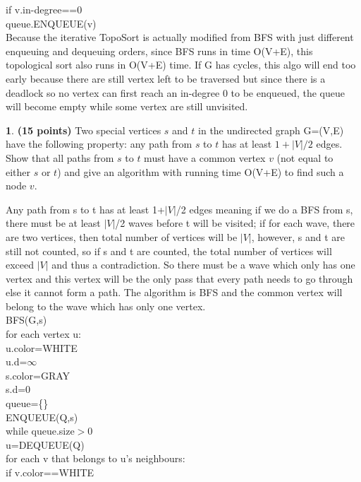\documentclass[11pt]{article}
\theoremstyle{definition}
\theoremstyle{theorem}
\newtheorem{prob}{}
\newcommand{\solution}{\medskip\noindent{\color{DarkBlue}\textbf{Solution:}}}
\begin{document}
\null\qquad\qquad\qquad if v.in-degree==0\\
\null\qquad\qquad\qquad\qquad queue.ENQUEUE(v)\\
Because the iterative TopoSort is actually modified from BFS with just different enqueuing and dequeuing orders, since BFS runs in time O(V+E), this topological sort also runs in O(V+E) time. If G has cycles, this algo will end too early because there are still vertex left to be traversed but since there is a deadlock so no vertex can first reach an in-degree 0 to be enqueued, the queue will become empty while some vertex are still unvisited.\\
\begin{prob} \textbf{(15 points)} Two special vertices $s$ and $t$ in the undirected graph G=(V,E) have the following  property:  any  path  from  $s$  to  $t$  has  at  least  $1  +|V|/2$  edges.   Show  that  all paths from $s$ to $t$ must have a common vertex $v$ (not equal to either $s$ or $t$) and give an algorithm with running time O(V+E) to find such a node $v$.
\end{prob}
\solution
Any path from s to t has at least 1+$|V|$/2 edges meaning if we do a BFS from s, there must be at least $|V|$/2 waves before t will be visited; if for each wave, there are two vertices, then total number of vertices will be $|V|$, however, s and t are still not counted, so if s and t are counted, the total number of vertices will exceed $|V|$ and thus a contradiction. So there must be a wave which only has one vertex and this vertex will be the only pass that every path needs to go through else it cannot form a path. The algorithm is BFS and the common vertex will belong to the wave which has only one vertex.\\
BFS(G,s)\\
\null\qquad for each vertex u:\\
\null\qquad\qquad u.color=WHITE\\
\null\qquad\qquad u.d=$\infty$\\
\null\qquad s.color=GRAY\\
\null\qquad s.d=0\\
\null\qquad queue=\{\}\\
\null\qquad ENQUEUE(Q,s)\\
\null\qquad while queue.size$>$0\\
\null\qquad\qquad u=DEQUEUE(Q)\\
\null\qquad\qquad for each v that belongs to u's neighbours:\\
\null\qquad\qquad\qquad if v.color==WHITE\\
\end{document}
